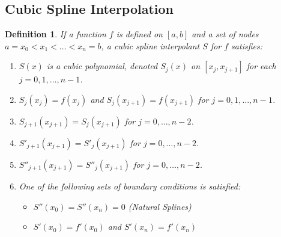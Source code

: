 \documentclass[12pt, a4paper]{article}
\theoremstyle{break}
\newtheorem{definition}{Definition}[section]
\begin{document}
\subsection{Cubic Spline Interpolation}
\begin{definition}
If a function $f$ is defined on $[a,b]$ and a set of nodes $a = x_0 < x_1 < \dots < x_n = b$, a cubic spline interpolant $S$ for $f$ satisfies:
\begin{enumerate}
    \item $S(x)$ is a cubic polynomial, denoted $S_j(x)$ on $[x_j, x_{j+1}]$ for each $j = 0, 1, \dots, n-1$.
    \item $S_j(x_j) = f(x_j)$ and $S_j(x_{j+1}) = f(x_{j+1})$ for $j = 0, 1, \dots, n-1$.
    \item $S_{j+1}(x_{j+1}) = S_j(x_{j+1})$ for $j = 0, \dots, n-2$.
    \item $S'_{j+1}(x_{j+1}) = S'_j(x_{j+1})$ for $j = 0, \dots, n-2$.
    \item $S''_{j+1}(x_{j+1}) = S''_j(x_{j+1})$ for $j = 0, \dots, n-2$.
    \item One of the following sets of boundary conditions is satisfied:
    \begin{itemize}
        \item $S''(x_0) = S''(x_n) = 0$ (Natural Splines)
        \item $S'(x_0) = f'(x_0)$ and $S'(x_n) = f'(x_n)$
    \end{itemize}
\end{enumerate}
\end{definition}
\end{document}
